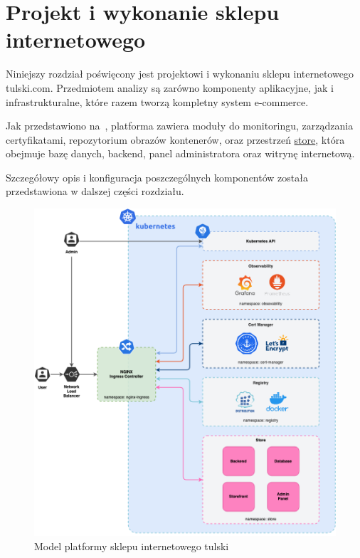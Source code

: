 \newpage

\section{Projekt i wykonanie sklepu internetowego}\label{sec:projekt-platformy}

Niniejszy rozdział poświęcony jest projektowi i wykonaniu sklepu internetowego tulski.com.
Przedmiotem analizy są zarówno komponenty aplikacyjne, jak i infrastrukturalne, które razem tworzą kompletny system e-commerce.

Jak przedstawiono na~, platforma zawiera moduły do monitoringu, zarządzania certyfikatami, repozytorium obrazów kontenerów, oraz przestrzeń \url{store}, która obejmuje bazę danych, backend, panel administratora oraz witrynę internetową.

Szczegółowy opis i konfiguracja poszczególnych komponentów została przedstawiona w dalszej części rozdziału.

\begin{figure}[p]
    \centering
    \includegraphics[width=\textwidth]{img/main-infra-model}
    \caption{Model platformy sklepu internetowego tulski}
    \label{fig:platform-model}
\end{figure}

